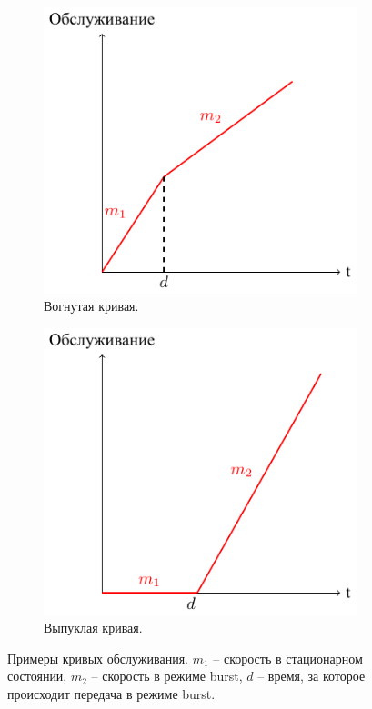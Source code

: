 		\begin{figure}[ht!]
		 	\center
            \begin{subfigure}[b]{0.3\textwidth}
                \includegraphics[width=\textwidth]{pdfimages/hfsc_concave.pdf}
                \caption{Вогнутая кривая.}
                \label{pic:hfsc_concave}
            \end{subfigure}
            \hspace{0.2\textwidth}
            \begin{subfigure}[b]{0.3\textwidth}
                \includegraphics[width=\textwidth]{pdfimages/hfsc_convex.pdf}
                \caption{Выпуклая кривая.}
                \label{pic:hfsc_convex}
            \end{subfigure}
			\caption{Примеры кривых обслуживания. $m_1$ -- скорость в стационарном состоянии,
			$m_2$ -- скорость в режиме burst, $d$ -- время, за которое происходит передача
			в режиме burst.\cite{hfscguide}}
			\label{pic:hfscline}
        \end{figure}

